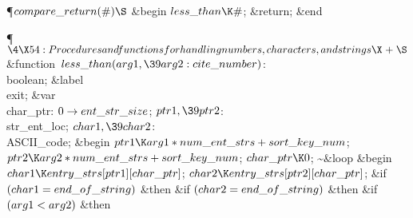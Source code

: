 \Y\P\D {}$\\{compare\_return}(\#)\S$\1\6
\&{begin} \6
$\\{less\_than}\K\#$;\5
\&{return};\6
\&{end}\2\par
\Y\P$\4\X54:Procedures and functions for handling numbers, characters, and
strings\X\mathrel{+}\S$\6
\4\&{function}\1\  $\\{less\_than}(\\{arg1},\39\\{arg2}:\\{cite\_number})$: %
\\{boolean};\6
\4\&{label} \\{exit};\6
\4\&{var} \\{char\_ptr}: $0\to\\{ent\_str\_size}$;\6
$\\{ptr1},\39\\{ptr2}$: \\{str\_ent\_loc};\6
$\\{char1},\39\\{char2}$: \\{ASCII\_code};\2\6
\&{begin} $\\{ptr1}\K\\{arg1}\ast\\{num\_ent\_strs}+\\{sort\_key\_num}$;\5
$\\{ptr2}\K\\{arg2}\ast\\{num\_ent\_strs}+\\{sort\_key\_num}$;\5
$\\{char\_ptr}\K0$;\6
\~ \1\&{loop}\6
\&{begin} $\\{char1}\K\\{entry\_strs}[\\{ptr1}][\\{char\_ptr}]$;\5
$\\{char2}\K\\{entry\_strs}[\\{ptr2}][\\{char\_ptr}]$;\6
\&{if} $(\\{char1}=\\{end\_of\_string})$ \1\&{then}\6
\&{if} $(\\{char2}=\\{end\_of\_string})$ \1\&{then}\6
\&{if} $(\\{arg1}<\\{arg2})$ \1\&{then}\5
